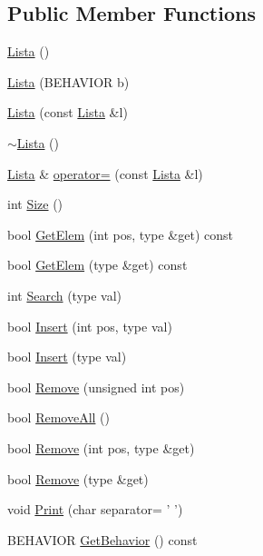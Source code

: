 \subsection*{Public Member Functions}
\begin{DoxyCompactItemize}
\item 
\hyperlink{classLista_af076a7c1dfedf5ac8ecb36964deca783}{Lista} ()
\item 
\hyperlink{classLista_a6453f7b9f27540814659787229d7bafc}{Lista} (B\+E\+H\+A\+V\+I\+O\+R b)
\item 
\hyperlink{classLista_ab1603c5fc93d55d5c70521bde0a45865}{Lista} (const \hyperlink{classLista}{Lista} \&l)
\item 
\hyperlink{classLista_a3fce7b3e78f9d20ca3e48f94fd221f25}{$\sim$\+Lista} ()
\item 
\hyperlink{classLista}{Lista} \& \hyperlink{classLista_ae1cc9720e5ec77d3919bb67242f91e85}{operator=} (const \hyperlink{classLista}{Lista} \&l)
\item 
int \hyperlink{classLista_a070deaea71f21839e20b8b07cd703a97}{Size} ()
\item 
bool \hyperlink{classLista_af127e2ac077a9e606622bfed0942db69}{Get\+Elem} (int pos, type \&get) const 
\item 
bool \hyperlink{classLista_a7f07cde0e5462dd947f359837460c5ca}{Get\+Elem} (type \&get) const 
\item 
int \hyperlink{classLista_a234b80661798a6f9001cacd309e1339d}{Search} (type val)
\item 
bool \hyperlink{classLista_a8797e9cf12a4f4e650d96f0059419090}{Insert} (int pos, type val)
\item 
bool \hyperlink{classLista_a2487cb1d29b4f62d1b98b420ca27c423}{Insert} (type val)
\item 
bool \hyperlink{classLista_aca38246307d3554aac78db4910465490}{Remove} (unsigned int pos)
\item 
bool \hyperlink{classLista_a2ad4af918b7dcf9dac12f8fc883459cf}{Remove\+All} ()
\item 
bool \hyperlink{classLista_afd4996cee3271a4efff2020b90eaf8c5}{Remove} (int pos, type \&get)
\item 
bool \hyperlink{classLista_a82c77b506683f0d7ea6a1148f4cdcd1a}{Remove} (type \&get)
\item 
void \hyperlink{classLista_a6994e358359f08c5f771edafbab8afa3}{Print} (char separator= ' ')
\item 
B\+E\+H\+A\+V\+I\+O\+R \hyperlink{classLista_a8ec31b5ab14a3337cc38d26ea06c1bc9}{Get\+Behavior} () const 
\end{DoxyCompactItemize}
